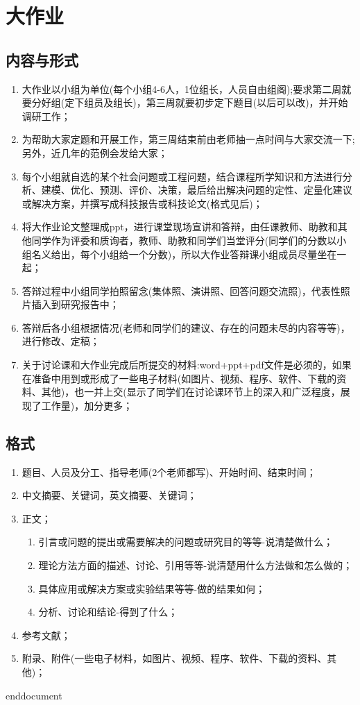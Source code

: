 	\section{大作业}
	\subsection{内容与形式}
	\begin{enumerate}
		\item 大作业以小组为单位(每个小组4-6人，1位组长，人员自由组阁);要求第二周就要分好组(定下组员及组长)，第三周就要初步定下题目(以后可以改)，并开始调研工作；
		\item 为帮助大家定题和开展工作，第三周结束前由老师抽一点时间与大家交流一下;另外，近几年的范例会发给大家；
		\item 每个小组就自选的某个社会问题或工程问题，结合课程所学知识和方法进行分析、建模、优化、预测、评价、决策，最后给出解决问题的定性、定量化建议或解决方案，并撰写成科技报告或科技论文(格式见后)；
		\item 将大作业论文整理成ppt，进行课堂现场宣讲和答辩，由任课教师、助教和其他同学作为评委和质询者，教师、助教和同学们当堂评分(同学们的分数以小组名义给出，每个小组给一个分数)，所以大作业答辩课小组成员尽量坐在一起；
		\item 答辩过程中小组同学拍照留念(集体照、演讲照、回答问题交流照)，代表性照片插入到研究报告中；
		\item 答辩后各小组根据情况(老师和同学们的建议、存在的问题未尽的内容等等)，进行修改、定稿；
		\item 关于讨论课和大作业完成后所提交的材料:word+ppt+pdf文件是必须的，如果在准备中用到或形成了一些电子材料(如图片、视频、程序、软件、下载的资料、其他)，也一并上交(显示了同学们在讨论课环节上的深入和广泛程度，展现了工作量)，加分更多；
	\end{enumerate}
	\subsection{格式}
	\begin{enumerate}
		\item 题目、人员及分工、指导老师(2个老师都写)、开始时间、结束时间；
		\item 中文摘要、关键词，英文摘要、关键词；
		\item 正文；
		\begin{enumerate}
			\item 引言或问题的提出或需要解决的问题或研究目的等等-说清楚做什么；
			\item 理论方法方面的描述、讨论、引用等等-说清楚用什么方法做和怎么做的；
			\item 具体应用或解决方案或实验结果等等-做的结果如何；
			\item 分析、讨论和结论-得到了什么；
		\end{enumerate}
		\item 参考文献；
		\item 附录、附件(一些电子材料，如图片、视频、程序、软件、下载的资料、其他)；
	\end{enumerate}

\ifx\allfiles\undefined
	
	
	
	end{document}
	\else
	\fi